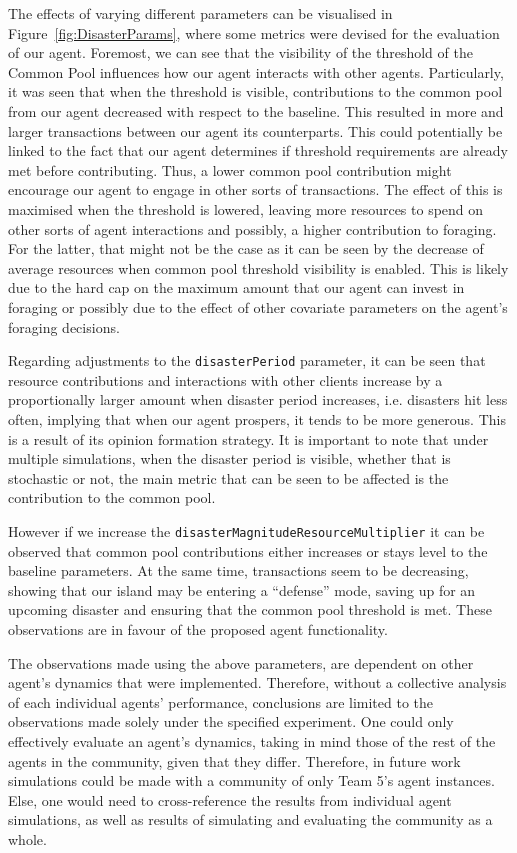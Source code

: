 The effects of varying different parameters can be visualised in 
Figure~\ref{fig:DisasterParams}, where some metrics were devised for the evaluation of our agent. Foremost, we can see that the visibility of the threshold of the Common Pool influences how our agent interacts with other agents. Particularly, it was seen that when the threshold is visible, contributions to the common pool from our agent decreased with respect to the baseline. This resulted in more and larger transactions between our agent its counterparts. This could potentially be linked to the fact that our agent determines if threshold requirements are already met before contributing. Thus, a lower common pool contribution might encourage our agent to engage in other sorts of transactions. The effect of this is maximised when the threshold is lowered, leaving more resources to spend on other sorts of agent interactions and possibly, a higher contribution to foraging. For the latter, that might not be the case as it can be seen by the decrease of average resources when common pool threshold visibility is enabled. This is likely due to the hard cap on the maximum amount that our agent can invest in foraging or possibly due to the effect of other covariate parameters on the agent's foraging decisions.

Regarding adjustments to the \texttt{disasterPeriod} parameter, it can be seen that resource contributions and interactions with other clients increase by a proportionally larger amount when disaster period increases, i.e. disasters hit less often, implying that when our agent prospers, it tends to be more generous. This is a result of its opinion formation strategy. It is important to note that under multiple simulations, when the disaster period is visible, whether that is stochastic or not, the main metric that can be seen to be affected is the contribution to the common pool. 

However if we increase the \texttt{disasterMagnitudeResourceMultiplier} it can be observed that common pool contributions either increases or stays level to the baseline parameters. At the same time, transactions seem to be decreasing, showing that our island may be entering a “defense” mode, saving up for an upcoming disaster and ensuring that the common pool threshold is met. These observations are in favour of the proposed agent functionality.

The observations made using the above parameters, are dependent on other agent’s dynamics that were implemented. Therefore, without a collective analysis of each individual agents’ performance, conclusions are limited to the observations made solely under the specified experiment. One could only effectively evaluate an agent’s dynamics, taking in mind those of the rest of the agents in the community, given that they differ. Therefore, in future work simulations could be made with a community of only Team 5’s agent instances. Else, one would need to cross-reference the results from individual agent simulations, as well as results of simulating and evaluating the community as a whole. 

